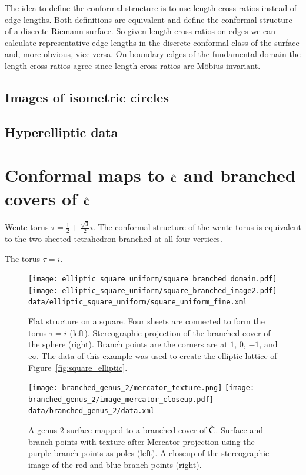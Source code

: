 \documentclass[Thesis.tex]{subfiles}
\begin{document}
The idea to define the conformal structure is to use length cross-ratios
instead of edge lengths. Both definitions are equivalent and define the
conformal structure of a discrete Riemann surface. So given length cross
ratios on edges we can calculate representative edge lengths in the discrete
conformal class of the surface and, more obvious, vice versa. On boundary
edges of the fundamental domain the length cross ratios agree since
length-cross ratios are M{\"o}bius invariant.


\subsection{Images of isometric circles}
\subsection{Hyperelliptic data}

\section{Conformal maps to $\hat{\mathbb C}$ and branched covers of $\hat{\mathbb C}$}

\begin{example}
\label{ex:wente_branched}
Wente torus $\tau=\frac{1}{2}+\frac{\sqrt 3}{2}i$. The conformal structure of
the wente torus is equivalent to the two sheeted tetrahedron branched at all
four vertices.
\end{example}

\begin{example}
\label{ex:square_branched}
The torus $\tau=i$.
\end{example}

\begin{figure} 
\centering
\texttt{[image: elliptic\_square\_uniform/square\_branched\_domain.pdf]}
\texttt{[image: elliptic\_square\_uniform/square\_branched\_image2.pdf]}
{\scriptsize\tt data/elliptic\_square\_uniform/square\_uniform\_fine.xml}
\caption{Flat structure on a square. Four sheets are connected to form the
torus $\tau=i$ (left).  Stereographic projection of the branched cover of the
sphere (right). Branch points are the corners are at $1$, $0$, $-1$, and
$\infty$. The data of this example was used to create the elliptic lattice
of Figure~\ref{fig:square_elliptic}.} 
\label{fig:square_branched}
\end{figure}

\begin{figure} 
\centering
\texttt{[image: branched\_genus\_2/mercator\_texture.png]}
\texttt{[image: branched\_genus\_2/image\_mercator\_closeup.pdf]}
{\scriptsize\tt data/branched\_genus\_2/data.xml} 
\caption{A genus $2$ surface mapped to a branched cover of $\hat{\mathbb C}$.  Surface
and branch points with texture after Mercator projection using the purple
branch points as poles (left). A closeup of the stereographic image of the red
and blue branch points (right).} 
\label{fig:genus2_branched} 
\end{figure}
\end{document}
